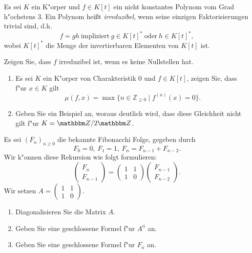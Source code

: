 \documentclass[a4,11pt]{article}
\begin{document}
\vspace*{-17mm}
{
\kopf
}


\begin{aufgabe}[4 Punkte]
Es sei $K$ ein K"orper und $f\in K[t]$ ein nicht konstantes Polynom vom Grad h"ochstens $3$. Ein Polynom heißt \emph{irreduzibel}, wenn seine einzigen Faktorisierungen trivial sind, d.h.
\[
f = gh \ \text{impliziert} \ g \in K[t]^* \ \text{oder} \ h\in K[t]^*,
\]
wobei $K[t]^*$ die Menge der invertierbaren Elementen von $K[t]$ ist.

Zeigen Sie, dass $f$ irreduzibel ist, wenn es keine Nullstellen hat.
\end{aufgabe}

\begin{aufgabe}[4 Punkte]
\begin{enumerate}
\item Es sei $K$ ein K"orper von Charakteristik $0$ und $f \in K[t]$, zeigen Sie, dass f"ur $x\in K$ gilt
\[
\mu(f,x) = \max \{ n \in \mathbb{Z}_{\geq 0} \mid  f^{(n)}(x) = 0 \}.
\]
\item Geben Sie ein Beispiel an, woraus deutlich wird, dass diese Gleichheit nicht gilt f"ur $K = \Z/2\Z$.
\end{enumerate}

\end{aufgabe}

\begin{aufgabe}[4 Punkte]
Es sei $(F_n)_{n\geq 0}$ die bekannte Fibonacchi Folge, gegeben durch
\[
F_0 = 0, \ F_1 = 1, \  F_{n} = F_{n-1} + F_{n-2}.
\]
Wir k"onnen diese Rekursion wie folgt formulieren:
\[
\begin{pmatrix}F_{n} \\ F_{n-1}\end{pmatrix} =
\begin{pmatrix} 1 & 1\\ 1 & 0\end{pmatrix}
\begin{pmatrix}F_{n-1} \\ F_{n-2}\end{pmatrix}.
\]
Wir setzen $A = \begin{pmatrix} 1 & 1\\ 1 & 0\end{pmatrix}$.
  
\begin{enumerate}
\item Diagonalisieren Sie die Matrix $A$.
\item Geben Sie eine geschlossene Formel f"ur $A^n$ an.
\item Geben Sie eine geschlossene Formel f"ur $F_n$ an.
\end{enumerate}

\end{aufgabe}
\end{document}
